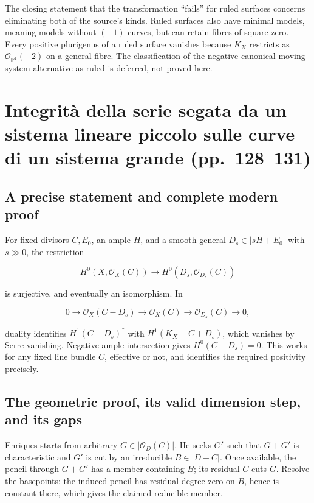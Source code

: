 The closing statement that the transformation ``fails'' for ruled surfaces concerns eliminating both of the source's kinds. Ruled surfaces also have minimal models, meaning models without \((-1)\)-curves, but can retain fibres of square zero. Every positive plurigenus of a ruled surface vanishes because \(K_X\) restricts as \(\mathcal O_{\mathbb P^1}(-2)\) on a general fibre. The classification of the negative-canonical moving-system alternative as ruled is deferred, not proved here.

\section[Restrizione dei sistemi lineari]{Integrità della serie segata da un sistema lineare piccolo sulle curve di un sistema grande (pp.~128--131)}\label{enriques-iv-10}

\subsection{A precise statement and complete modern proof}

For fixed divisors \(C,E_0\), an ample \(H\), and a smooth general \(D_s\in|sH+E_0|\) with \(s\gg0\), the restriction

\[
H^0(X,\mathcal O_X(C))\longrightarrow H^0(D_s,\mathcal O_{D_s}(C))
\]

is surjective, and eventually an isomorphism. In

\[
0\to\mathcal O_X(C-D_s)\to\mathcal O_X(C)
\to\mathcal O_{D_s}(C)\to0,
\]

duality identifies \(H^1(C-D_s)^*\) with \(H^1(K_X-C+D_s)\), which vanishes by Serre vanishing. Negative ample intersection gives \(H^0(C-D_s)=0\). This works for any fixed line bundle \(C\), effective or not, and identifies the required positivity precisely.

\subsection{The geometric proof, its valid dimension step, and its gaps}

Enriques starts from arbitrary \(G\in|\mathcal O_D(C)|\). He seeks \(G'\) such that \(G+G'\) is characteristic and \(G'\) is cut by an irreducible \(B\in|D-C|\). Once available, the pencil through \(G+G'\) has a member containing \(B\); its residual \(C\) cuts \(G\). Resolve the basepoints: the induced pencil has residual degree zero on \(B\), hence is constant there, which gives the claimed reducible member.

